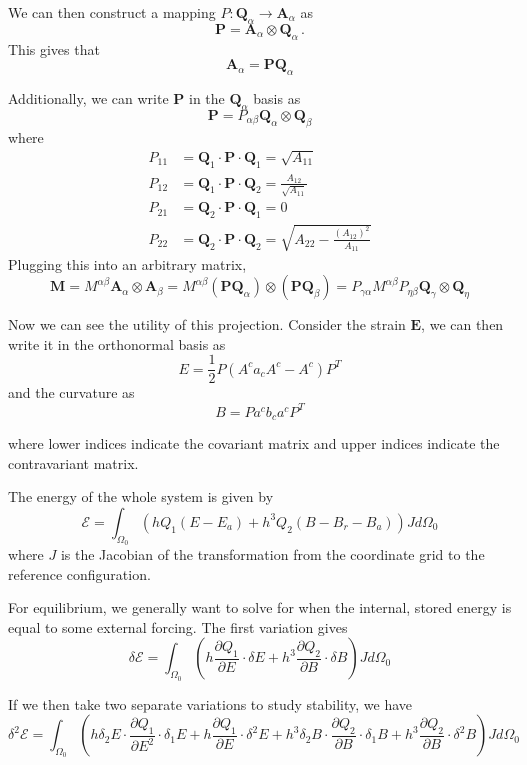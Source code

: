 \documentclass[11pt]{article}
\theoremstyle{plain}
\theoremstyle{definition}
\begin{document}
We can then construct a mapping $P : \mathbf{Q}_\alpha \to \mathbf{A}_\alpha$ as 
\[
\mathbf{P} = \mathbf{A}_\alpha \otimes \mathbf{Q}_{\alpha}\, .
\]
This gives that
\[
\mathbf{A}_\alpha = \mathbf{P}\mathbf{Q}_\alpha
\]

Additionally, we can write $\mathbf{P}$ in the $\mathbf{Q}_\alpha$ basis as
\[
\mathbf{P} = P_{\alpha \beta} \mathbf{Q}_\alpha \otimes \mathbf{Q}_\beta
\]
where
\[
\begin{split}
P_{11} &= \mathbf{Q}_1 \cdot \mathbf{P} \cdot \mathbf{Q}_1 = \sqrt{A_{11}} \\
P_{12} &= \mathbf{Q}_1 \cdot \mathbf{P} \cdot \mathbf{Q}_2 = \frac{A_{12}}{\sqrt{A_{11}}} \\
P_{21} &= \mathbf{Q}_2 \cdot \mathbf{P} \cdot \mathbf{Q}_1 = 0 \\
P_{22} &= \mathbf{Q}_2 \cdot \mathbf{P} \cdot \mathbf{Q}_2 = \sqrt{A_{22} - \frac{(A_{12})^2}{A_{11}}}
\end{split}
\]
Plugging this into an arbitrary matrix,
\[
\mathbf{M} = M^{\alpha \beta} \mathbf{A}_\alpha \otimes \mathbf{A}_\beta =  M^{\alpha \beta} \left( \mathbf{P} \mathbf{Q}_\alpha\right) \otimes \left( \mathbf{P} \mathbf{Q}_\beta \right) = P_{\gamma \alpha} M^{\alpha \beta} P_{\eta \beta} \mathbf{Q}_{\gamma} \otimes \mathbf{Q}_\eta
\]

Now we can see the utility of this projection. Consider the strain $\mathbf{E}$, we can then write it in the orthonormal basis as
\[
E = \frac{1}{2} P  \left( A^{c} a_c A^{c} - A^c \right)P^T
\]
and the curvature as
\[
B = P a^c b_c a^c P^T
\]

where lower indices indicate the covariant matrix and upper indices indicate the contravariant matrix.

The energy of the whole system is given by
\[
\mathcal{E} = \int_{\Omega_0} \left( h Q_1 (E - E_a)  + h^3 Q_2 (B - B_r - B_a)\right) J d \Omega_0
\]
where $J$ is the Jacobian of the transformation from the coordinate grid to the reference configuration.

For equilibrium, we generally want to solve for when the internal, stored energy is equal to some external forcing. The first variation gives
\[
\delta \mathcal{E} = \int_{\Omega_0} \left( h \dfrac{\partial Q_1}{\partial E} \cdot \delta E + h^3 \dfrac{\partial Q_2}{\partial B} \cdot \delta B \right) J d\Omega_0
\]

If we then take two separate variations to study stability, we have
\[
\delta^2 \mathcal{E} = \int_{\Omega_0} \left( h \delta_2 E \cdot \dfrac{\partial Q_1}{\partial E^2} \cdot \delta_1 E  + h \dfrac{\partial Q_1}{\partial E} \cdot \delta^2 E + h^3 \delta_2 B \cdot \dfrac{\partial Q_2}{\partial B} \cdot \delta_1 B + h^3\dfrac{\partial Q_2}{\partial B} \cdot \delta^2 B \right)J d\Omega_0
\]
\end{document}
